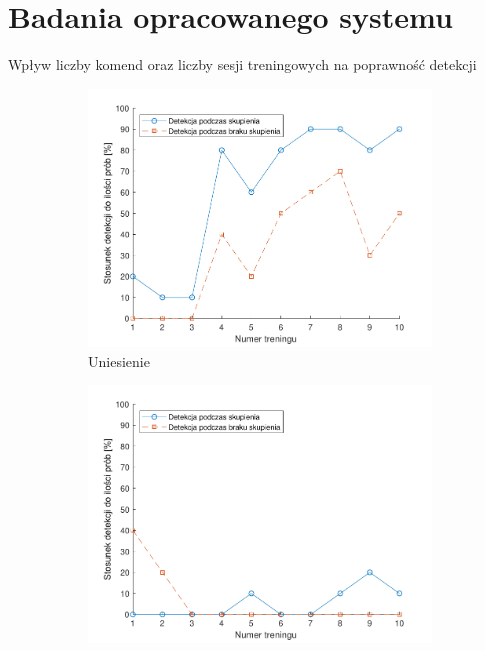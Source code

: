 \documentclass[10pt,aspectratio=169]{beamer}
\begin{document}
\section{Badania opracowanego systemu}
\begin{frame}{Wpływ liczby komend oraz liczby sesji treningowych na poprawność detekcji}
  \begin{figure}[htb]
    \centering
    \begin{subfigure}{0.3\linewidth}
    \includegraphics[width=\linewidth,keepaspectratio]{obrazy/up}
    \caption{Uniesienie}
    \end{subfigure}\hspace*{\fill}
    \begin{subfigure}{0.3\linewidth}
    \includegraphics[width=\linewidth,keepaspectratio]{obrazy/right}

\end{subfigure}
\end{figure}
\end{frame}
\end{document}
